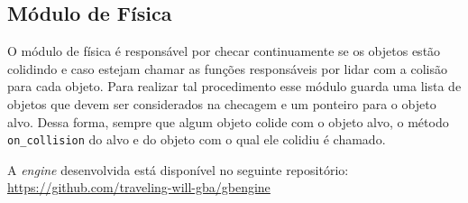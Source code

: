 \subsection{Módulo de Física}

O módulo de física é responsável por checar continuamente se os objetos estão colidindo e caso estejam chamar as funções responsáveis por lidar com a colisão para cada objeto. Para realizar tal procedimento esse módulo guarda uma lista de objetos que devem ser considerados na checagem e um ponteiro para o objeto alvo. Dessa forma, sempre que algum objeto colide com o objeto alvo, o método \texttt{on\_collision} do alvo e do objeto com o qual ele colidiu é chamado.


A \textit{engine} desenvolvida está disponível no seguinte repositório: \url{https://github.com/traveling-will-gba/gbengine}